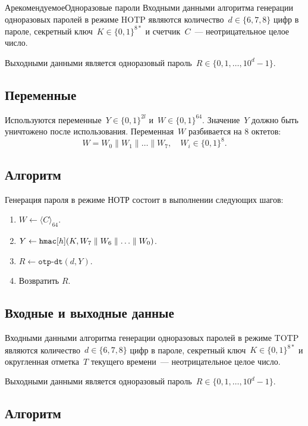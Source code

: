 \begin{appendix}{А}{рекомендуемое}{Одноразовые пароли}
Входными данными алгоритма генерации одноразовых паролей
в режиме HOTP являются 
количество~$d\in\{6,7,8\}$ цифр в пароле,
секретный ключ~$K\in\{0,1\}^{8*}$
и счетчик~$C$~--- неотрицательное целое число.

Выходными данными является одноразовый пароль~$R\in\{0,1,\ldots,10^d-1\}$.

\subsection{Переменные}

Используются переменные~$Y\in\{0,1\}^{2l}$ и~$W\in\{0,1\}^{64}$.
Значение~$Y$ должно быть уничтожено после использования.
%
Переменная~$W$ разбивается на $8$ октетов:
$$
W=W_0\parallel W_1\parallel\ldots\parallel W_7,\quad
W_i\in\{0,1\}^8.
$$

\subsection{Алгоритм}

Генерация пароля в режиме НОТР состоит в выполнении следующих шагов:
\begin{enumerate}
\item
$W\leftarrow\langle C\rangle_{64}$.

\item
$Y\leftarrow\texttt{hmac}[h](K,W_7\parallel W_6\parallel\ldots\parallel W_0)$.

\item
$R\leftarrow\texttt{otp-dt}(d, Y)$.

\item
Возвратить $R$.
\end{enumerate}

\label{OTP.TOTP}

\subsection{Входные и выходные данные}

Входными данными алгоритма генерации одноразовых паролей
в режиме TOTP являются 
количество~$d\in\{6,7,8\}$ цифр в пароле,
секретный ключ~$K\in\{0,1\}^{8*}$ и округленная отметка~$T$ текущего 
времени~--- неотрицательное целое число.

Выходными данными является одноразовый пароль~$R\in\{0,1,\ldots,10^d-1\}$.

\subsection{Алгоритм}


\end{appendix}
